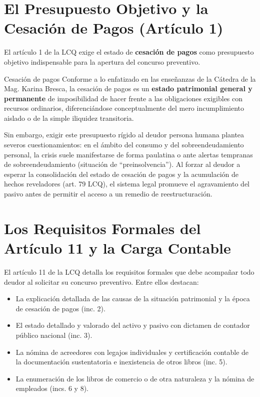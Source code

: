 \documentclass[12pt,oneside]{book}
\begin{document}
\section{El Presupuesto Objetivo y la Cesación de Pagos (Artículo 1)}

El artículo 1 de la LCQ exige el estado de \textbf{cesación de pagos} como presupuesto objetivo indispensable para la apertura del concurso preventivo.

\begin{definition}{Cesación de pagos}
Conforme a lo enfatizado en las enseñanzas de la Cátedra de la Mag. Karina Bresca, la cesación de pagos es un \textbf{estado patrimonial general y permanente} de imposibilidad de hacer frente a las obligaciones exigibles con recursos ordinarios, diferenciándose conceptualmente del mero incumplimiento aislado o de la simple iliquidez transitoria.
\end{definition}

Sin embargo, exigir este presupuesto rígido al deudor persona humana plantea severos cuestionamientos: en el ámbito del consumo y del sobreendeudamiento personal, la crisis suele manifestarse de forma paulatina o ante alertas tempranas de sobreendeudamiento (situación de ``preinsolvencia''). Al forzar al deudor a esperar la consolidación del estado de cesación de pagos y la acumulación de hechos reveladores (art. 79 LCQ), el sistema legal promueve el agravamiento del pasivo antes de permitir el acceso a un remedio de reestructuración.

\section{Los Requisitos Formales del Artículo 11 y la Carga Contable}

El artículo 11 de la LCQ detalla los requisitos formales que debe acompañar todo deudor al solicitar su concurso preventivo. Entre ellos destacan:

\begin{itemize}
    \item La explicación detallada de las causas de la situación patrimonial y la época de cesación de pagos (inc. 2).
    \item El estado detallado y valorado del activo y pasivo con dictamen de contador público nacional (inc. 3).
    \item La nómina de acreedores con legajos individuales y certificación contable de la documentación sustentatoria e inexistencia de otros libros (inc. 5).
    \item La enumeración de los libros de comercio o de otra naturaleza y la nómina de empleados (incs. 6 y 8).
\end{itemize}
\end{document}
